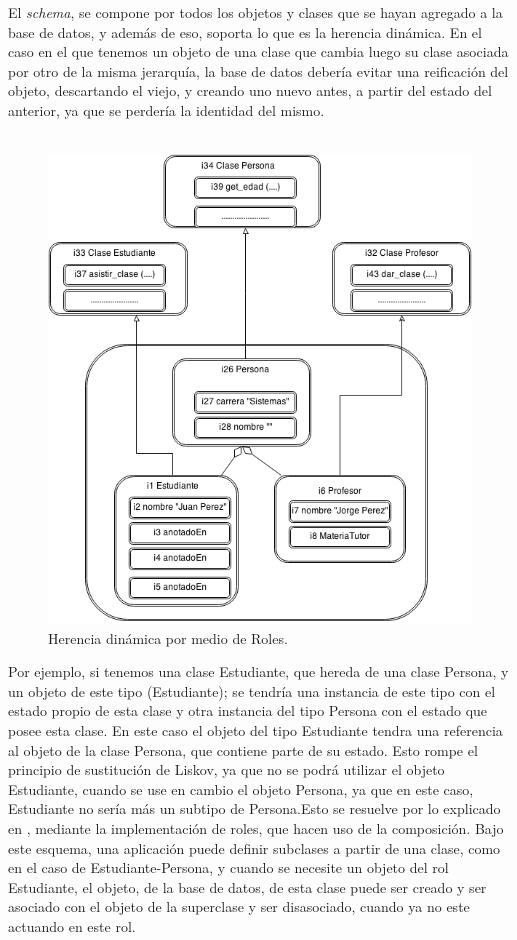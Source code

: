 \documentclass{melta}
\begin{document}
El \textit{schema}, se compone por todos los objetos y clases que se hayan agregado a la base de datos, y además de eso, soporta lo que es la herencia dinámica. En el caso en el que tenemos un objeto de una clase que cambia luego su clase asociada por otro de la misma jerarquía, la base de datos debería evitar una reificación del objeto, descartando el viejo, y creando uno nuevo antes, a partir del estado del anterior, ya que se perdería la identidad del mismo. 
\\\\
\begin{figure}
\centering
\includegraphics[scale=0.43]{MeltaHerenciaDinamica}
\caption{Herencia dinámica por medio de Roles.}
\label{melta:herenciaDinamica}
\end{figure}

Por ejemplo, si tenemos una clase Estudiante, que hereda de una clase Persona, y un objeto de este tipo (Estudiante); se tendría una instancia de este tipo con el estado propio de esta clase y otra instancia del tipo Persona con el estado que posee esta clase. En este caso el objeto del tipo Estudiante tendra una referencia al objeto de la clase Persona, que contiene parte de su estado. Esto rompe el principio de sustitución de Liskov, ya que no se podrá utilizar el objeto Estudiante, cuando se use en cambio el objeto Persona, ya que en este caso, Estudiante no sería más un subtipo de Persona.Esto se resuelve por lo explicado en \cite{OMG:oodbs}, mediante la implementación de roles, que hacen uso de la composición. Bajo este esquema, una aplicación puede definir subclases a partir de una clase, como en el caso de Estudiante-Persona, y cuando se necesite un objeto del rol Estudiante, el objeto, de la base de datos, de esta clase puede ser creado y ser asociado con el objeto de la superclase y ser disasociado, cuando ya no este actuando en este rol.
\\\\
\end{document}
